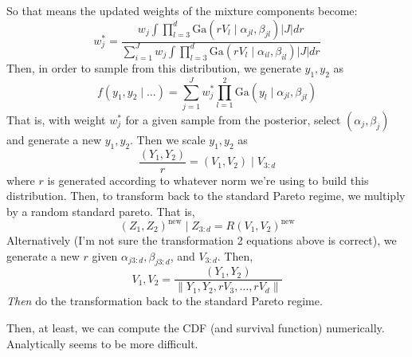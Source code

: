 \documentclass{article}
\begin{document}
So that means the updated weights of the mixture components become:
\begin{equation*}
  w_j^{*} = \frac{w_j\int\prod_{l = 3}^d\text{Ga}(rV_l\mid \alpha_{jl},\beta_{jl})\lvert J\rvert dr}{
      \sum_{i = 1}^J w_j\int\prod_{l = 3}^d\text{Ga}(rV_l\mid \alpha_{il},\beta_{il})\lvert J\rvert dr
      }
\end{equation*}
Then, in order to sample from this distribution, we generate $y_1,y_2$ as
\begin{equation*}
f(y_1,y_2 \mid \ldots) = \sum_{j = 1}^J w_j^{*}\prod_{l = 1}^2 \text{Ga}(y_l\mid \alpha_{jl},\beta_{jl})
\end{equation*}
That is, with weight $w_j^{*}$ for a given sample from the posterior, select $(\alpha_j,\beta_j)$
  and generate a new $y_1,y_2$.  Then we scale $y_1,y_2$ as
\begin{equation*}
  \frac{(Y_1,Y_2)}{r} = (V_1,V_2)\mid V_{3:d}
\end{equation*}
where $r$ is generated according to whatever norm we're using to build this distribution.  Then,
  to transform back to the standard Pareto regime, we multiply by a random standard pareto.  That is,
\begin{equation*}
  (Z_{1},Z_2)^{\text{new}}\mid Z_{3:d} = R(V_1,V_2)^{\text{new}}
\end{equation*}
Alternatively (I'm not sure the transformation 2 equations above is correct), we generate a new $r$
  given $\alpha_{j3:d}, \beta_{j3:d}$, and $V_{3:d}$.  Then,
\begin{equation*}
  V_1,V_2 = \frac{(Y_1,Y_2)}{\lVert Y_1,Y_2,rV_3,\ldots,rV_d\rVert}
\end{equation*}
\emph{Then} do the transformation back to the standard Pareto regime.

Then, at least, we can compute the CDF (and survival function) numerically.  Analytically seems to
  be more difficult.
\end{document}
